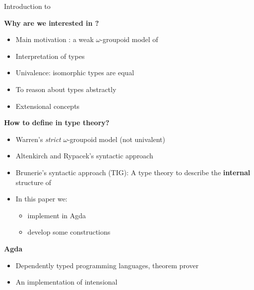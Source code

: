 \documentclass[12pt, mathserif,handout]{beamer}
\begin{document}
\begin{frame}[allowframebreaks,c]{Introduction to \wog}
\framebreak


\textbf{Why are we interested in \wog?}
\begin{itemize}
\item Main motivation : a weak $\omega$-groupoid model of \hott
\item Interpretation of types
\item Univalence: isomorphic types are equal
\item To reason about types abstractly
\item Extensional concepts
\end{itemize}

\framebreak

\textbf{How to define \wog in type theory?}


\begin{itemize}
\item Warren's \emph{strict} $\omega$-groupoid model (not univalent)
\item Altenkirch and Rypacek's syntactic approach
\item Brunerie's syntactic approach \tig (TIG): A type theory to describe
the \textbf{internal} structure of \wog

\item In this paper we:
\begin{itemize}
\item implement \tig in Agda
\item develop some constructions
\end{itemize}
\end{itemize}

\textbf{Agda}
\begin{itemize}
\item Dependently typed programming languages, theorem prover
\item An implementation of intensional \mltt
\end{itemize}






\end{frame}
\end{document}
